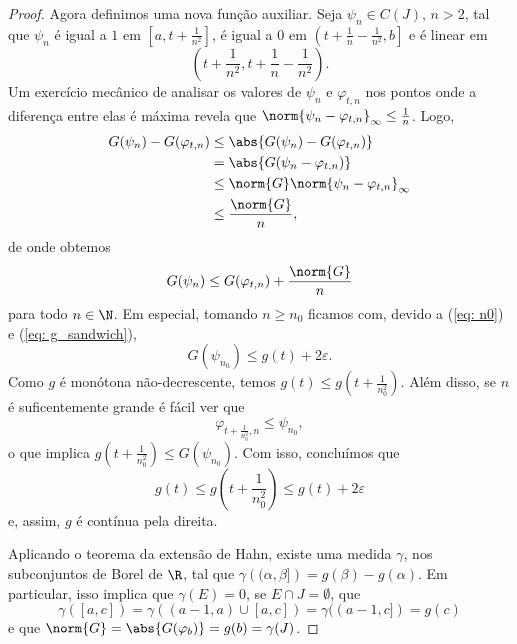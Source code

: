 \begin{proof}
    Agora definimos uma nova função auxiliar.
    Seja \( \psi_{ n } \in C(J) \), \( n > 2 \), tal que \( \psi_{ n } \) é igual a \( 1 \) em \( \left[a, t + \frac{ 1 }{ n^2 }\right] \), é igual a \( 0 \) em \( \left(t + \frac{ 1 }{ n } - \frac{ 1 }{ n^2 }, b\right] \) e é linear em \[
        \left(t + \frac{ 1 }{ n^2 }, t + \frac{ 1 }{ n } - \frac{ 1 }{ n^2 }\right)
    .\]
    Um exercício mecânico de analisar os valores de \( \psi_{ n } \) e \( \varphi_{ t, n } \) nos pontos onde a diferença entre elas é máxima revela que \( \norm{ \psi_{ n } - \varphi_{ t, n } }_{ \infty } \leq \frac{ 1 }{ n } \).
    Logo,
    \begin{align*}
        G(\psi_{ n }) - G(\varphi_{ t, n })
        &\leq\abs{ G(\psi_{ n }) - G(\varphi_{ t, n }) } \\
        &= \abs{ G(\psi_{ n } - \varphi_{ t, n }) } \\
        &\leq \norm{ G } \norm{ \psi_{ n } - \varphi_{ t, n } }_{ \infty } \\
        &\leq \frac{ \norm{ G } }{ n }
    ,\end{align*}
    de onde obtemos \[
        G(\psi_{ n }) \leq G(\varphi_{ t, n }) + \frac{ \norm{ G } }{ n }
    \]
    para todo \( n \in \N \).
    Em especial, tomando \( n \geq n_{ 0 } \) ficamos com, devido a (\ref{eq: n0}) e (\ref{eq: g_sandwich}), \[
        G(\psi_{ n_{ 0 } }) \leq g(t) + 2 \varepsilon
    .\]
    Como \( g \) é monótona não-decrescente, temos \( g(t) \leq g \left(t + \frac{ 1 }{ n_{ 0 }^2 } \right) \).
    Além disso, se \( n \) é suficentemente grande é fácil ver que \[
        \varphi_{ t + \frac{ 1 }{ n_{ 0 }^2 }, n } \leq \psi_{ n_{ 0 } }
    ,\]
    o que implica \( g \left( t + \frac{ 1 }{ n_{ 0 }^2 } \right) \leq G(\psi_{ n_{ 0 } }) \).
    Com isso, concluímos que \[
        g(t) \leq g \left( t + \frac{ 1 }{ n_{ 0 }^2 } \right) \leq g(t) + 2 \varepsilon
    \]
    e, assim, \( g \) é contínua pela direita.

    Aplicando o teorema da extensão de Hahn, existe uma medida \( \gamma \), nos subconjuntos de Borel de \( \R \), tal que \( \gamma \left((\alpha, \beta]\right) = g(\beta) - g(\alpha) \).
    Em particular, isso implica que \( \gamma(E) = 0 \), se \( E \cap J = \emptyset \), que \[
        \gamma ([a, c]) = \gamma((a-1, a) \cup [a, c]) = \gamma((a-1, c]) = g(c)
    \]
    e que \( \norm{ G } = \abs{ G(\varphi_{ b }) } = g(b) = \gamma(J) \).


\end{proof}

